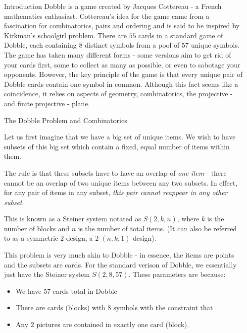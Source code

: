 \documentclass[final]{beamer}
\newlength{\sepwidth}
\newlength{\colwidth}
\newcommand{\separatorcolumn}{\begin{column}{\sepwidth}\end{column}}
\begin{document}
\begin{frame}[t]
\begin{columns}[t]
\separatorcolumn

\begin{column}{\colwidth}

  \begin{block}{Introduction}
    Dobble is a game created by Jacques Cottereau - a French mathematics enthusiast. Cottereau’s idea for the game came from a fascination for combinatorics, pairs and ordering and is said to be inspired by Kirkman’s schoolgirl problem. There are $55$ cards in a standard game of Dobble, each containing $8$ distinct symbols from a pool of $57$ unique symbols. The game has taken many different forms - some versions aim to get rid of your cards first, some to collect as many as possible, or even to sabotage your opponents. However, the key principle of the game is that every unique pair of Dobble cards contain one symbol in common. Although this fact seems like a coincidence, it relies on aspects of geometry, combinatorics, the projective - and finite projective - plane. 
  \end{block}

  \begin{block}{The Dobble Problem and Combinatorics}

    Let us first imagine that we have a big set of unique items. We wish to have subsets of this big set which contain a fixed, equal number of items within them.
    
    The rule is that these subsets have to have an overlap of \emph{one item} - there cannot be an overlap of two unique items between any two subsets. In effect, for any pair of items in any subset, \emph{this pair cannot reappear in any other subset}.

    This is known as a Steiner system notated as $S(2,k,n)$, where $k$ is the number of blocks and $n$ is the number of total items. (It can also be referred to as a symmetric $2$-design, a $2$-$(n,k,1)$ design).

This problem is very much akin to Dobble - in essence, the items are points and the subsets are cards. For the standard verison of Dobble, we essentially just have the Steiner system $S(2,8,57)$.
These parameters are because:
\begin{itemize}
    \item We have 57 cards total in Dobble
    \item There are cards (blocks) with $8$ symbols with the constraint that
    \item Any $2$ pictures are contained in exactly one card (block).
\end{itemize}


\end{block}
\end{column}
\end{columns}
\end{frame}
\end{document}
